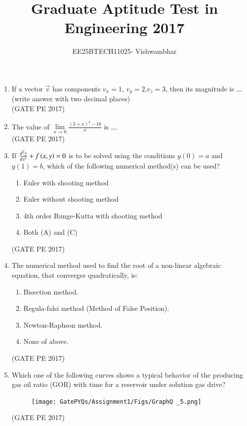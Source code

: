 \documentclass[journal,12pt,onecolumn]{IEEEtran}
\title{Graduate Aptitude Test in Engineering 2017}
\author{EE25BTECH11025- Vishwambhar}
\theoremstyle{remark}
\begin{document}
\maketitle

\begin{enumerate}
 
\item If a vector $\vec{v}$ has components $v_x = 1$, $v_y = 2$,$v_z = 3$, then its magnitude is \dots.\\
(write answer with two decimal places)\\

\hfill{(GATE PE 2017)}

\item The value of $\lim\limits_{x \to 0} \frac{(2 + x)^4 - 16}{x} $ is \dots.\\

\hfill{(GATE PE 2017)}

\item If $\frac{d^2 y}{dx^2} + f\left(x, y\right) = 0$ is to be solved using the conditions $y(0) = a$ and $y(1) = b$, which of the following numerical method(s) can be used?
\begin{enumerate}
\item Euler with shooting method
\item Euler without shooting method
\item 4th order Runge-Kutta with shooting method
\item Both (A) and (C)
\end{enumerate}
\hfill{(GATE PE 2017)}

\item The numerical method used to find the root of a non-linear algebraic equation, that converges quadratically, is:
\begin{enumerate}
\item Bisection method.
\item Regula-falsi method (Method of False Position).
\item Newton-Raphson method.
\item None of above.
\end{enumerate}
\hfill{(GATE PE 2017)}

\item Which one of the following curves shows a typical behavior of the producing gas oil ratio (GOR) with time for a reservoir under solution gas drive?
\begin{figure}[h]
    \centering
    \texttt{[image: GatePYQs/Assignment1/Figs/GraphQ \_5.png]}
\end{figure}
\hfill{(GATE PE 2017)}


\end{enumerate}
\end{document}
